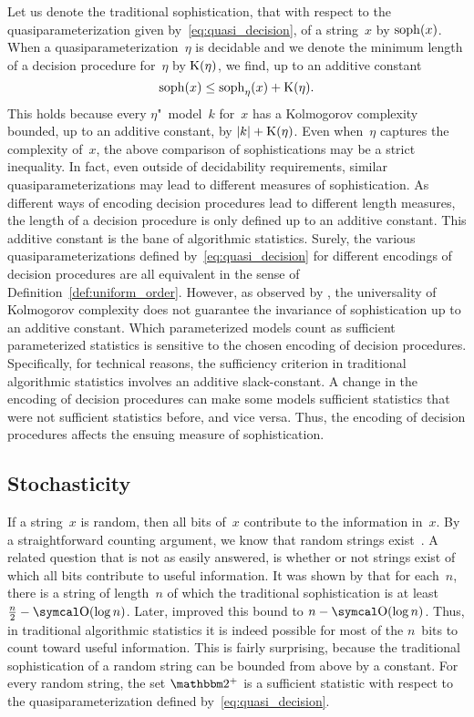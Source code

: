 %
Let us denote the traditional sophistication, that with respect to the quasiparameterization given by~\eqref{eq:quasi_decision}, of a string~$x$ by $\operatorname{soph}(x)$.
When a quasiparameterization~$\eta$ is decidable and we denote the minimum length of a decision procedure for~$\eta$ by $\operatorname{K}(\eta)$, we find, up to an additive constant
\begin{equation}
\label{eq:soph}
  \operatorname{soph}(x) \le \operatorname{soph}_\eta(x) + \operatorname{K}(\eta).
\end{equation}
This holds because every $\eta$"~model~$k$ for~$x$ has a Kolmogorov complexity bounded, up to an additive constant, by ${\lvert k\rvert} + \operatorname{K}(\eta)$.
Even when~$\eta$ captures the complexity of~$x$, the above comparison of sophistications may be a strict inequality.
In fact, even outside of decidability requirements, similar quasiparameterizations may lead to different measures of sophistication.
As different ways of encoding decision procedures lead to different length measures, the length of a decision procedure is only defined up to an additive constant.
This additive constant is the bane of algorithmic statistics.
Surely, the various quasiparameterizations defined by~\eqref{eq:quasi_decision} for different encodings of decision procedures are all equivalent in the sense of Definition~\ref{def:uniform_order}.
However, as observed by \textcite{vereshchagin2009algorithmic,bloem2015two}, the universality of Kolmogorov complexity does not guarantee the invariance of sophistication up to an additive constant.
Which parameterized models count as sufficient parameterized statistics is sensitive to the chosen encoding of decision procedures.
Specifically, for technical reasons, the sufficiency criterion in traditional algorithmic statistics involves an additive slack-constant.
A change in the encoding of decision procedures can make some models sufficient statistics that were not sufficient statistics before, and vice versa.
Thus, the encoding of decision procedures affects the ensuing measure of sophistication.

\subsection{Stochasticity}
\label{sec:statistics:stochasticity}%
If a string~$x$ is random, then all bits of~$x$ contribute to the information in~$x$.
By a straightforward counting argument, we know that random strings exist~\parencite{li2008introduction}.
A related question that is not as easily answered, is whether or not strings exist of which all bits contribute to useful information.
It was shown by \textcite{shen1983concept} that for each~$n$, there is a string of length~$n$ of which the traditional sophistication is at least $\frac{n}{2} - \bigO(\log n)$.
Later, \textcite{gacs2001algorithmic} improved this bound to $n - \bigO(\log n)$.
Thus, in traditional algorithmic statistics it is indeed possible for most of the $n$~bits to count toward useful information.
This is fairly surprising, because the traditional sophistication of a random string can be bounded from above by a constant.
For every random string, the set $\binary^+$ is a sufficient statistic with respect to the quasiparameterization defined by~\eqref{eq:quasi_decision}.

